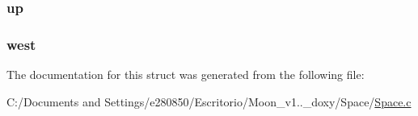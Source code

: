 \hypertarget{struct___space_a14c9edeb1d5c55f866c6b692673a9c45}{
\subsubsection[{up}]{ up}}\label{struct___space_a14c9edeb1d5c55f866c6b692673a9c45}
\hypertarget{struct___space_a2a48d53ab6fa715ffa1280307a865e1f}{
\subsubsection[{west}]{ west}}\label{struct___space_a2a48d53ab6fa715ffa1280307a865e1f}


The documentation for this struct was generated from the following file\+:\begin{DoxyCompactItemize}
\item 
C\+:/\+Documents and Settings/e280850/\+Escritorio/\+Moon\+\_\+v1..\+\_\+doxy/\+Space/\hyperlink{_space_8c}{Space.\+c}\end{DoxyCompactItemize}
